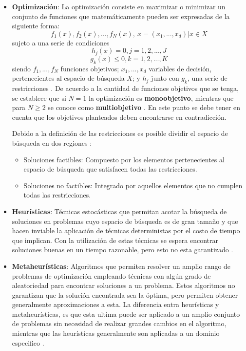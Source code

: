 \documentclass[11pt,letterpaper]{article}
\begin{document}
\begin{itemize}
\item \textbf{Optimización}: La optimización consiste en maximizar o minimizar un conjunto de funciones que matemáticamente pueden ser expresadas de la siguiente forma:
$$f_1(x),f_2(x), ..., f_N(x),\ x=(x_1,...,x_d) | x \in X$$
sujeto a una serie de condiciones
$$h_j(x) = 0, j=1,2,...,J$$
$$g_k(x) \leq 0, k=1,2,...,K$$
siendo $f_1,...,f_N$ funciones objetivos; $x_1, ..., x_d$ variables de decisión, pertenecientes al espacio de búsqueda $X$; y $h_j$ junto con $g_k$, una serie de restricciones \cite{Yang2015}. De acuerdo a la cantidad de funciones objetivos que se tenga, se establece que si $N=1$ la optimización es \textbf{monoobjetivo}, mientras que para $N\geq 2$ se conoce como \textbf{multiobjetivo} \cite{Yang2015}. En este punto se debe tener en cuenta que los objetivos planteados deben encontrarse en contradicción. 

Debido a la definición de las restricciones es posible dividir el espacio de búsqueda en dos regiones \cite{Bozorg-Haddad2017}:
\begin{itemize}
	\item Soluciones factibles: Compuesto por los elementos pertenecientes al espacio de búsqueda que satisfacen todas las restricciones.
	\item Soluciones no factibles: Integrado por aquellos elementos que no cumplen todas las restricciones.
\end{itemize}

\item \textbf{Heurísticas}: Técnicas estocásticas que permitan acotar la búsqueda de soluciones en problemas cuyo espacio de búsqueda es de gran tamaño y que hacen inviable la aplicación de técnicas deterministas por el costo de tiempo que implican. Con la utilización de estas técnicas se espera encontrar soluciones buenas en un tiempo razonable, pero esto no esta garantizado \cite{Yang2015,Romanycia1985}.


\item \textbf{Metaheurísticas}: Algoritmos que permiten resolver un amplio rango de problemas de optimización empleando técnicas con algún grado de aleatoriedad para encontrar soluciones a un problema. Estos algoritmos no garantizan que la solución encontrada sea la óptima, pero permiten obtener generalmente aproximaciones a esta. La diferencia entra heurísticas y metaheurísticas, es que esta ultima puede ser aplicado a un amplio conjunto de problemas sin necesidad de realizar grandes cambios en el algoritmo, mientras que las heurísticas generalmente son aplicadas a un dominio especifico \cite{Yang2015,Boussaid2013,Luke2013}.


\end{itemize}
\end{document}
